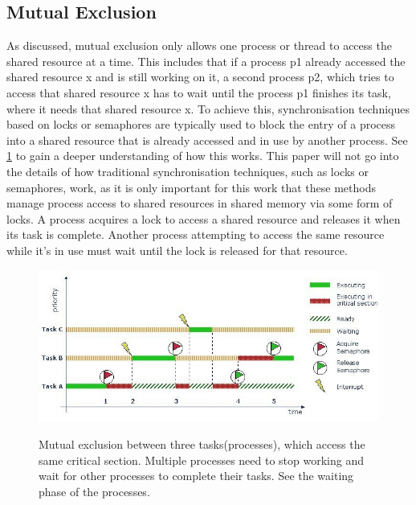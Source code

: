 \subsection{Mutual Exclusion}\label{subsec:mutual-exclusion}

As discussed, mutual exclusion only allows one process or thread to access the shared resource at a time. This includes that if a process p1 already accessed the shared resource x and is still working on it, a second process p2, which tries to access that shared resource x has to wait until the process p1 finishes its task, where it needs that shared resource x. To achieve this, synchronisation techniques based on locks or semaphores are typically used to block the entry of a process into a shared resource that is already accessed and in use by another process. See \cref{fig:mutual-exclusion} to gain a deeper understanding of how this works. This paper will not go into the details of how traditional synchronisation techniques, such as locks or semaphores, work, as it is only important for this work that these methods manage process access to shared resources in shared memory via some form of locks. A process acquires a lock to access a shared resource and releases it when its task is complete. Another process attempting to access the same resource while it's in use must wait until the lock is released for that resource.

\begin{figure}[!ht]
    \centering
    \captionsetup{justification=centering}
    \caption{Mutual exclusion between three tasks(processes), which access the same critical section. Multiple processes need to stop working and wait for other processes to complete their tasks. See the waiting phase of the processes.}
    \includegraphics[width=135mm]{images/mutual_exclusion.jpg}
    \cite{MutualExclusion}
    \label{fig:mutual-exclusion}
\end{figure}

